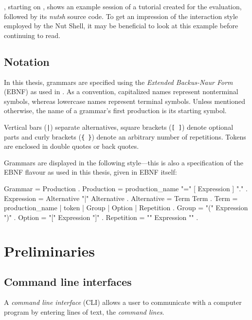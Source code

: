 \documentclass[paper=a4,twoside,abstract=on,cleardoublepage=empty,numbers=noenddot,toc=bib,12pt,appendixprefix=true]{scrreprt}
\begin{document}

, starting on , shows an example session of a tutorial created for the evaluation, followed by its \emph{nutsh} source code. To get an impression of the interaction style employed by the Nut Shell, it may be beneficial to look at this example before continuing to read.

\section{Notation}
\label{sec:ebnf}

In this thesis, grammars are specified using the \emph{Extended Backus-Naur Form} (EBNF) as used in \cite{wirth77}. As a convention, capitalized names represent nonterminal symbols, whereas lowercase names represent terminal symbols. Unless mentioned otherwise, the name of a grammar's first production is its starting symbol.

Vertical bars (\texttt{|}) separate alternatives, square brackets (\texttt{[ ]}) denote optional parts and curly brackets (\texttt{\{ \}}) denote an arbitrary number of repetitions. Tokens are enclosed in double quotes or back quotes.

Grammars are displayed in the following style---this is also a specification of the EBNF flavour as used in this thesis, given in EBNF itself:

\begin{ebnf}
Grammar     = { Production } .
Production  = production_name "=" [ Expression ] "." .
Expression  = Alternative { "|" Alternative } .
Alternative = Term { Term } .
Term        = production_name | token | Group | Option | Repetition .
Group       = "(" Expression ")" .
Option      = "[" Expression "]" .
Repetition  = "{" Expression "}" .
\end{ebnf}

\chapter{Preliminaries}
\label{sec:preliminaries}

\section{Command line interfaces}
\label{sec:cli}

A \emph{command line interface} (\textsc{CLI}) allows a user to communicate with a computer program by entering lines of text, the \emph{command lines}.
\end{document}
